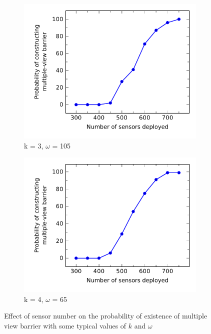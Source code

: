 %
\begin{figure}[!h]
	\begin{subfigure}{.5\textwidth}
		\centering
		\includegraphics[scale=.8]{Hinhanh/SensorNumberEffect/probability/k3omega105.pdf}
		\caption{k = 3, $\omega$ = 105}
	\end{subfigure}
	\begin{subfigure}{.5\textwidth}
		\centering
		\includegraphics[scale=.8]{Hinhanh/SensorNumberEffect/probability/k4omega65.pdf}
		\caption{k = 4, $\omega$ = 65}
	\end{subfigure}
\caption{Effect of sensor number on the probability of existence of multiple view barrier with some typical values of $k$ and $\omega$}
\label{fig:np}
\end{figure}


